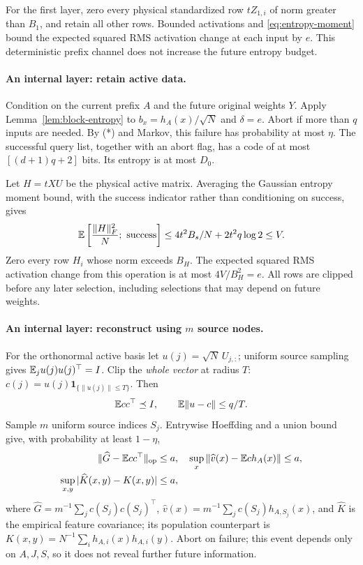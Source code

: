 For the first layer, zero every physical standardized row $tZ_{1,i}$ of norm
greater than $B_1$, and retain all other rows. Bounded activations and
\eqref{eq:entropy-moment} bound the expected squared RMS activation change
at each input by $e$. This deterministic prefix channel does not increase the
future entropy budget.

\paragraph{An internal layer: retain active data.}
Condition on the current prefix $A$ and the future original weights $Y$.
Apply Lemma~\ref{lem:block-entropy} to
$b_x=h_A(x)/\sqrt N$ and $\delta=e$. Abort if more than $q$ inputs are needed.
By (*) and Markov, this failure has probability at most $\eta$.
The successful query list, together with an abort flag, has a code of at most
$[(d+1)q+2]$ bits. Its entropy is at most $D_0$.

Let $H=tXU$ be the physical active matrix. Averaging the Gaussian entropy
moment bound, with the success indicator rather than conditioning on success, gives
\[
 \E\left[\frac{\|H\|_F^2}{N};\ \text{success}\right]
 \le4t^2B_s/N+2t^2q\log2\le V.
\]
Zero every row $H_i$ whose norm exceeds $B_H$. The expected squared RMS
activation change from this operation is at most $4V/B_H^2=e$.
All rows are clipped before any later selection, including selections that
may depend on future weights.

\paragraph{An internal layer: reconstruct using $m$ source nodes.}
For the orthonormal active basis let $u(j)=\sqrt N\,U_{j,:}$; uniform source
sampling gives $\mathbb E_j u(j)u(j)^\top=I$.
Clip the \emph{whole vector} at radius $T$:
$c(j)=u(j)\mathbf1_{\{\|u(j)\|\le T\}}$. Then
\[
 \mathbb E cc^\top\preceq I,\qquad \mathbb E\|u-c\|\le q/T.
\]
Sample $m$ uniform source indices $S_j$. Entrywise Hoeffding and a union bound
give, with probability at least $1-\eta$,
\begin{align*}
 \|\widehat G-\mathbb E cc^\top\|_{\mathrm{op}}&\le a,\quad
 \sup_x\|\widehat v(x)-\mathbb E c h_A(x)\|\le a,\\
 \sup_{x,y}|\widehat K(x,y)-K(x,y)|&\le a,
\end{align*}
where $\widehat G=m^{-1}\sum_jc(S_j)c(S_j)^\top$,
$\widehat v(x)=m^{-1}\sum_jc(S_j)h_{A,S_j}(x)$, and $\widehat K$ is the
empirical feature covariance; its population counterpart is
$K(x,y)=N^{-1}\sum_i h_{A,i}(x)h_{A,i}(y)$.
Abort on failure; this event depends only on
$A,J,S$, so it does not reveal further future information.

